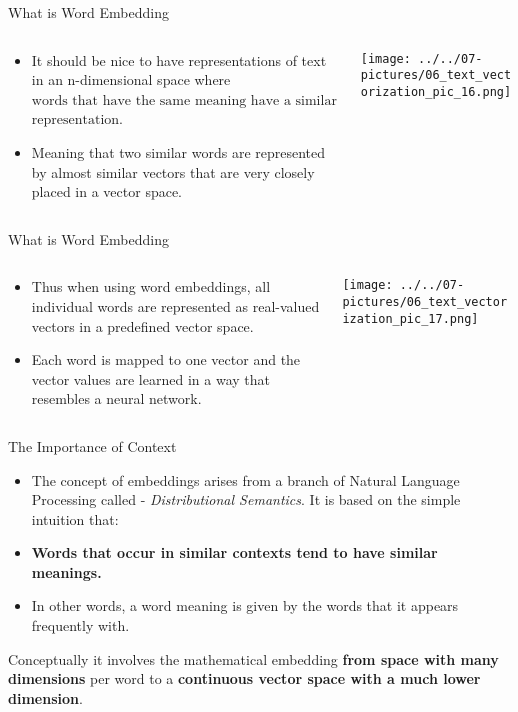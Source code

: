 \documentclass[11pt]{beamer}
\newcommand{\highlight}[1]{%
  \colorbox{yellow!100}{$\displaystyle#1$}}
\begin{document}
\begin{frame}{What is Word Embedding}
\begin{columns}[T] %
\begin{column}{.48\textwidth}
        \begin{itemize}
		\item It should be nice to have representations of text in an n-dimensional space where \highlight{\text{words that have the same}} 
\highlight{\text{meaning have a similar}} 
\highlight{\text{representation}}. 
		\item Meaning that two similar words are represented by almost similar vectors that are very closely placed in a vector space. 
        \end{itemize}
\end{column}%
\hfill%
\begin{column}{.48\textwidth}
        \texttt{[image: ../../07-pictures/06\_text\_vectorization\_pic\_16.png]}
\end{column}%
\end{columns}
\end{frame}
\begin{frame}{What is Word Embedding}
\begin{columns}[T] %
\begin{column}{.48\textwidth}
        \begin{itemize}
		\item Thus when using word embeddings, all individual words are represented as real-valued vectors in a predefined vector space. 
		\item Each word is mapped to one vector and the vector values are learned in a way that resembles a neural network.
        \end{itemize}
\end{column}%
\hfill%
\begin{column}{.48\textwidth}
        \texttt{[image: ../../07-pictures/06\_text\_vectorization\_pic\_17.png]}
\end{column}%
\end{columns}
\end{frame}
\begin{frame}{The Importance of Context}
	\begin{itemize}
		\item The concept of embeddings arises from a branch of Natural Language Processing called - \textit{Distributional Semantics}. It is based on the simple intuition that:
		\item \textbf{Words that occur in similar contexts tend to have similar meanings.}
		\item In other words, a word meaning is given by the words that it appears frequently with.
	\end{itemize}
	
\begin{tcolorbox}
Conceptually it involves the mathematical embedding \textbf{from space with many dimensions} per word to a \textbf{continuous vector space with a much lower dimension}.
\end{tcolorbox}

\end{frame}
\end{document}
